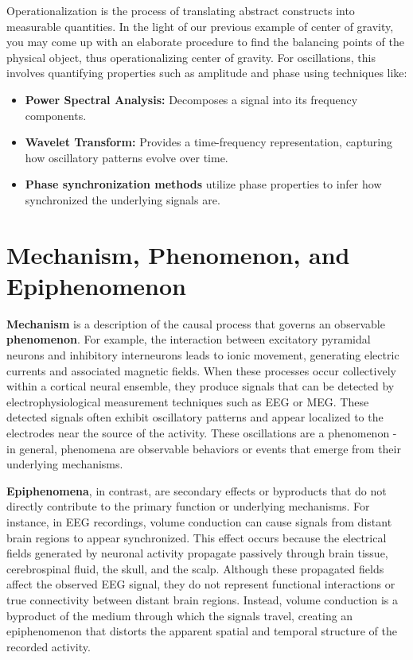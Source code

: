Operationalization is the process of translating abstract constructs into measurable quantities. 
In the light of our previous example of center of gravity, you may come up with an elaborate procedure to find the balancing points of the physical object, thus operationalizing center of gravity.
For oscillations, this involves quantifying properties such as amplitude and phase using techniques like:
\begin{itemize}
\item \textbf{Power Spectral Analysis:} Decomposes a signal into its frequency components.
\item \textbf{Wavelet Transform:} Provides a time-frequency representation, capturing how oscillatory patterns evolve over time.
\item \textbf{Phase synchronization methods} utilize phase properties to infer how synchronized the underlying signals are.
\end{itemize}

\section{Mechanism, Phenomenon, and Epiphenomenon}

\textbf{Mechanism} is a description of the causal process that governs an observable \textbf{phenomenon}. For example, the interaction between excitatory pyramidal neurons and inhibitory interneurons leads to ionic movement, generating electric currents and associated magnetic fields. When these processes occur collectively within a cortical neural ensemble, they produce signals that can be detected by electrophysiological measurement techniques such as EEG or MEG. These detected signals often exhibit oscillatory patterns and appear localized to the electrodes near the source of the activity. These oscillations are a phenomenon -  in general, phenomena are observable behaviors or events that emerge from their underlying mechanisms. 

\textbf{Epiphenomena}, in contrast, are secondary effects or byproducts that do not directly contribute to the primary function or underlying mechanisms. For instance, in EEG recordings, volume conduction can cause signals from distant brain regions to appear synchronized. This effect occurs because the electrical fields generated by neuronal activity propagate passively through brain tissue, cerebrospinal fluid, the skull, and the scalp. Although these propagated fields affect the observed EEG signal, they do not represent functional interactions or true connectivity between distant brain regions. Instead, volume conduction is a byproduct of the medium through which the signals travel, creating an epiphenomenon that distorts the apparent spatial and temporal structure of the recorded activity. 

